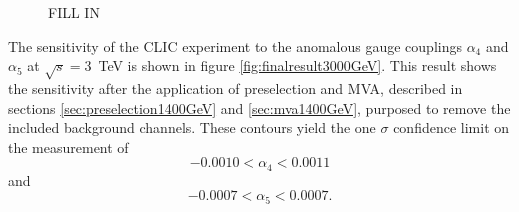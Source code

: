 \begin{figure}[h!]
\centering
{}
\caption[]{FILL IN}
\label{fig:eventweights3000}
\end{figure}

The sensitivity of the CLIC experiment to the anomalous gauge couplings $\alpha_{4}$ and $\alpha_{5}$ at $\sqrt{s}=3$~TeV is shown in figure \ref{fig:finalresult3000GeV}.  This result shows the sensitivity after the application of preselection and MVA, described in sections \ref{sec:preselection1400GeV} and \ref{sec:mva1400GeV}, purposed to remove the included background channels.  These contours yield the one $\sigma$ confidence limit on the measurement of 
%
\begin{equation}
-0.0010 < \alpha_{4} < 0.0011 
\end{equation}
\noindent and 
\begin{equation}
-0.0007 < \alpha_{5} < 0.0007 \text{.}
\end{equation}
%

